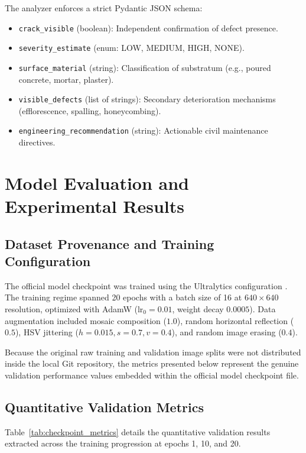 \documentclass[12pt,a4paper,oneside]{report}
\begin{document}
The analyzer enforces a strict Pydantic JSON schema:
\begin{itemize}
  \item \texttt{crack\_visible} (boolean): Independent confirmation of defect presence.
  \item \texttt{severity\_estimate} (enum: LOW, MEDIUM, HIGH, NONE).
  \item \texttt{surface\_material} (string): Classification of substratum (e.g., poured concrete, mortar, plaster).
  \item \texttt{visible\_defects} (list of strings): Secondary deterioration mechanisms (efflorescence, spalling, honeycombing).
  \item \texttt{engineering\_recommendation} (string): Actionable civil maintenance directives.
\end{itemize}


\chapter{Model Evaluation and Experimental Results}
\label{ch:results}

\section{Dataset Provenance and Training Configuration}
The official model checkpoint was trained using the Ultralytics configuration . The training regime spanned 20 epochs with a batch size of 16 at $640\times640$ resolution, optimized with AdamW ($\text{lr}_0 = 0.01$, weight decay $0.0005$). Data augmentation included mosaic composition ($1.0$), random horizontal reflection ($0.5$), HSV jittering ($h=0.015, s=0.7, v=0.4$), and random image erasing ($0.4$).

Because the original raw training and validation image splits were not distributed inside the local Git repository, the metrics presented below represent the genuine validation performance values embedded within the official model checkpoint file.

\section{Quantitative Validation Metrics}
Table~\ref{tab:checkpoint_metrics} details the quantitative validation results extracted across the training progression at epochs 1, 10, and 20.
\end{document}
